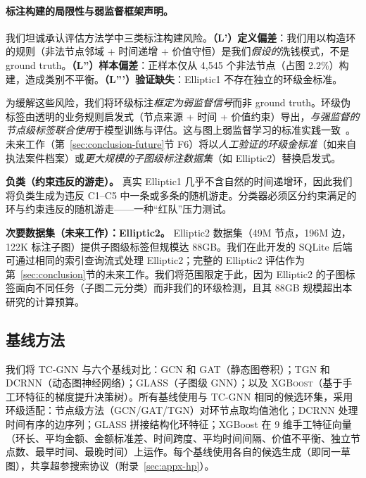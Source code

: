 \documentclass[journal,onecolumn]{IEEEtran}
\begin{document}
\paragraph{标注构建的局限性与弱监督框架声明。}

我们坦诚承认评估方法学中三类标注构建风险。\textbf{（L'）定义偏差}：我们用以构造环的规则（非法节点邻域 + 时间递增 + 价值守恒）是我们\emph{假设的}洗钱模式，不是 ground truth。\textbf{（L''）样本偏差}：正样本仅从 4{,}545 个非法节点（占图 2.2\%）构建，造成类别不平衡。\textbf{（L'''）验证缺失}：Elliptic1 不存在独立的环级金标准。

为缓解这些风险，我们将环级标注\emph{框定为弱监督信号}而非 ground truth。环级伪标签由透明的业务规则启发式（节点来源 + 时间 + 价值约束）导出，\emph{与强监督的节点级标签联合使用}于模型训练与评估。这与图上弱监督学习的标准实践一致~\cite{inspectionL2024,lawal2025}。未来工作（第~\ref{sec:conclusion-future}节 F6）将以\emph{人工验证的环级金标准}（如来自执法案件档案）或\emph{更大规模的子图级标注数据集}（如 Elliptic2）替换启发式。

\textbf{负类（约束违反的游走）。} 真实 Elliptic1 几乎不含自然的时间递增环，因此我们将负类生成为违反 C1--C5 中一条或多条的随机游走。分类器必须区分约束满足的环与约束违反的随机游走——一种``红队''压力测试。

\textbf{次要数据集（未来工作）：Elliptic2。} Elliptic2 数据集（49M 节点，196M 边，122K 标注子图）提供子图级标签但规模达 $88$GB。我们在此开发的 SQLite 后端可通过相同的索引查询流式处理 Elliptic2；完整的 Elliptic2 评估作为第~\ref{sec:conclusion}节的未来工作。我们将范围限定于此，因为 Elliptic2 的子图标签面向不同任务（子图二元分类）而非我们的环级检测，且其 $88$GB 规模超出本研究的计算预算。

\subsection{基线方法}
\label{sec:exp-baselines}

我们将 TC-GNN 与六个基线对比：\textsc{GCN} 和 \textsc{GAT}（静态图卷积）；\textsc{TGN} 和 \textsc{DCRNN}（动态图神经网络）；\textsc{GLASS}（子图级 GNN）；以及 \textsc{XGBoost}（基于手工环特征的梯度提升决策树）。所有基线使用与 TC-GNN 相同的候选环集，采用环级适配：节点级方法（GCN/GAT/TGN）对环节点取均值池化；DCRNN 处理时间有序的边序列；GLASS 拼接结构化环特征；XGBoost 在 9 维手工特征向量（环长、平均金额、金额标准差、时间跨度、平均时间间隔、价值不平衡、独立节点数、最早时间、最晚时间）上运作。每个基线使用各自的候选生成（即同一草图），共享超参搜索协议（附录~\ref{sec:appx-hp}）。
\end{document}
